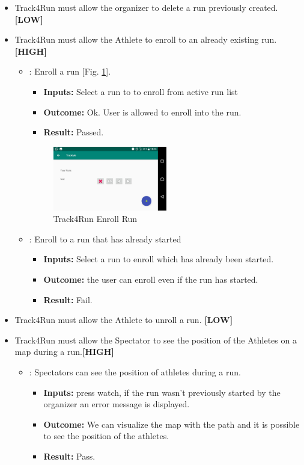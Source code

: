\documentclass[a4paper, hidelinks, 12pt]{report}
\newcommand\requirement[1]{\item[{[REQ-#1]}] }
\newcommand\test[1]{\item[{[TEST-#1]}] }
\begin{document}
\begin{itemize}
	\requirement{27} Track4Run must allow the organizer to delete a run previously created. \textbf{[LOW]}
	\requirement{28} Track4Run must allow the Athlete to enroll to an already existing run. \textbf{[HIGH]}
		\begin{itemize}
	\test{20} : Enroll a run [Fig. \ref{fig:run_list}].
				\begin{itemize}
			\item \textbf{Inputs: } Select a run to to enroll from active run list
			\item \textbf{Outcome: } Ok. User is allowed to enroll into the run.
			\item \textbf{Result: } Passed.
			\end{itemize}
\begin{figure}[H]
					\centering
				\includegraphics[width=0.5\textwidth]{images/runs_list.jpeg}
					\caption[Track4Run Enroll Run]{Track4Run Enroll Run}
				\label{fig:run_list}
			\end{figure}
\test{21} : Enroll to a run that has already started
				\begin{itemize}
			\item \textbf{Inputs: } Select a run to enroll which has already been started.
			\item \textbf{Outcome: } the user can enroll even if the run has started.
			\item \textbf{Result: } Fail. 
			\end{itemize}

	\end{itemize}
	\requirement{29}  Track4Run must allow the Athlete to unroll a run. \textbf{[LOW]}
 	\requirement{30} Track4Run must allow the Spectator to see the position of the Athletes on a map during a run.\textbf{[HIGH]}
 			\begin{itemize}
	\test{22} : Spectators can see the position of athletes during a run.
				\begin{itemize}
			\item \textbf{Inputs: } press watch, if the run wasn't previously started by the organizer an error message is displayed.
			\item \textbf{Outcome: } We can visualize the map with the path and it is possible to see the position of the athletes.
			\item \textbf{Result: } Pass.
			\end{itemize}


\end{itemize}
\end{itemize}
\end{document}
